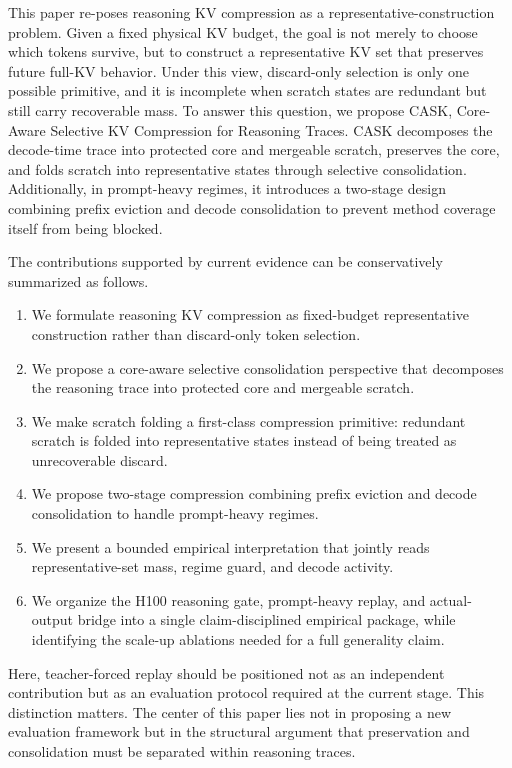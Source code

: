 This paper re-poses reasoning KV compression as a representative-construction problem. Given a fixed physical KV budget, the goal is not merely to choose which tokens survive, but to construct a representative KV set that preserves future full-KV behavior. Under this view, discard-only selection is only one possible primitive, and it is incomplete when scratch states are redundant but still carry recoverable mass. To answer this question, we propose CASK, Core-Aware Selective KV Compression for Reasoning Traces. CASK decomposes the decode-time trace into protected core and mergeable scratch, preserves the core, and folds scratch into representative states through selective consolidation. Additionally, in prompt-heavy regimes, it introduces a two-stage design combining prefix eviction and decode consolidation to prevent method coverage itself from being blocked.


The contributions supported by current evidence can be conservatively summarized as follows.


\begin{enumerate}
\item We formulate reasoning KV compression as fixed-budget representative construction rather than discard-only token selection.
\item We propose a core-aware selective consolidation perspective that decomposes the reasoning trace into protected core and mergeable scratch.
\item We make scratch folding a first-class compression primitive: redundant scratch is folded into representative states instead of being treated as unrecoverable discard.
\item We propose two-stage compression combining prefix eviction and decode consolidation to handle prompt-heavy regimes.
\item We present a bounded empirical interpretation that jointly reads representative-set mass, regime guard, and decode activity.
\item We organize the H100 reasoning gate, prompt-heavy replay, and actual-output bridge into a single claim-disciplined empirical package, while identifying the scale-up ablations needed for a full generality claim.
\end{enumerate}


Here, teacher-forced replay should be positioned not as an independent contribution but as an evaluation protocol required at the current stage. This distinction matters. The center of this paper lies not in proposing a new evaluation framework but in the structural argument that preservation and consolidation must be separated within reasoning traces.


